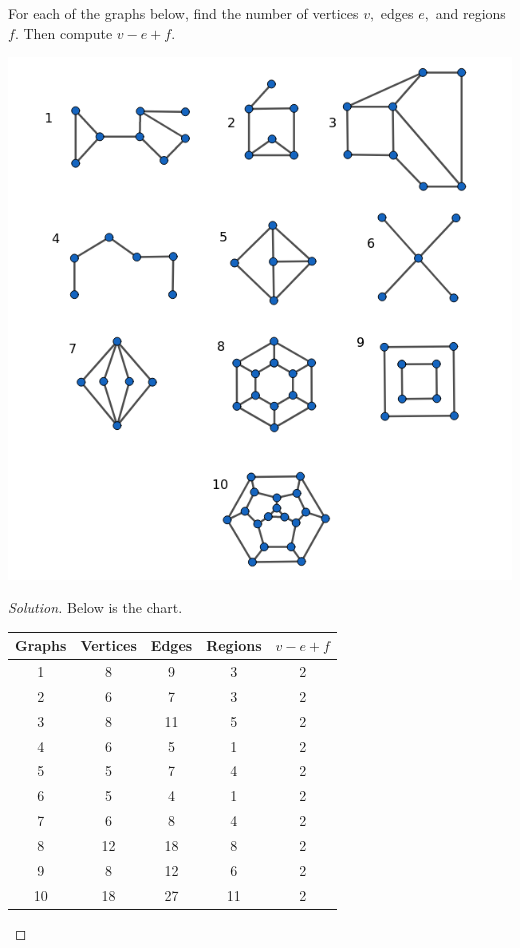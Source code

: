 \documentclass[12pt]{article}
\newenvironment{exercise}[2][Exercise]{\begin{trivlist}
        \item[\hskip \labelsep {\bfseries #1}\hskip \labelsep {\bfseries #2.}]}{\end{trivlist}}
\newenvironment{solution}
        {\begin{proof}[Solution]}
                    {\end{proof}}
\begin{document}
\begin{exercise}{53}
    For each of the graphs below, find the number of vertices \( v, \) edges \( e, \) and regions \( f. \) Then compute \( v-e+f. \)
    \begin{center}
        \includegraphics[scale=.5]{53}
    \end{center}
    \begin{solution}
        Below is the chart.
        \begin{center}
            \begin{tabular}{| c | c | c | c | c |}
                \hline
                Graphs & Vertices & Edges & Regions & \( v-e+f \)\\
                \hline
                \hline
                1 & 8 & 9 & 3 & 2\\
                2 & 6 & 7 & 3 & 2\\
                3 & 8 & 11 & 5 & 2\\
                4 & 6 & 5 & 1 & 2\\
                5 & 5 & 7 & 4 & 2\\
                6 & 5 & 4 & 1 & 2\\
                7 & 6 & 8 & 4 & 2\\
                8 & 12 & 18 & 8 & 2\\
                9 & 8 & 12 & 6 & 2\\
                10 & 18 & 27 & 11 & 2\\
                \hline
            \end{tabular}
        \end{center}
    \end{solution}
\end{exercise}
\end{document}
